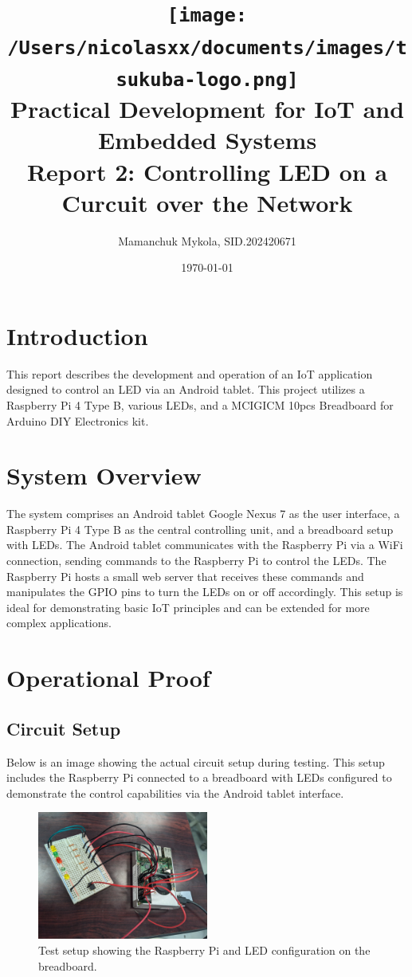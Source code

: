 \documentclass[12pt,a4paper]{article}
\title{
    \texttt{[image: /Users/nicolasxx/documents/images/tsukuba-logo.png]} \\
    \textbf{Practical Development for IoT and Embedded Systems} \\
    \vspace{3mm}    
    Report 2: Controlling LED on a Curcuit over the Network
}
\author{Mamanchuk Mykola, SID.202420671}
\date{\today}
\begin{document}
\maketitle

\section{Introduction}
This report describes the development and operation of an IoT application designed to control an LED via an Android tablet. This project utilizes a Raspberry Pi 4 Type B, various LEDs, and a MCIGICM 10pcs Breadboard for Arduino DIY Electronics kit.

\section{System Overview}
The system comprises an Android tablet Google Nexus 7 as the user interface, a Raspberry Pi 4 Type B as the central controlling unit, and a breadboard setup with LEDs. The Android tablet communicates with the Raspberry Pi via a WiFi connection, sending commands to the Raspberry Pi to control the LEDs. The Raspberry Pi hosts a small web server that receives these commands and manipulates the GPIO pins to turn the LEDs on or off accordingly. This setup is ideal for demonstrating basic IoT principles and can be extended for more complex applications.

\section{Operational Proof}
\subsection{Circuit Setup}
Below is an image showing the actual circuit setup during testing. This setup includes the Raspberry Pi connected to a breadboard with LEDs configured to demonstrate the control capabilities via the Android tablet interface.

\begin{figure}[h]
\centering
\includegraphics[width=0.5\textwidth]{materials/circuit_image.jpg}
\caption{Test setup showing the Raspberry Pi and LED configuration on the breadboard.}
\end{figure}
\end{document}
